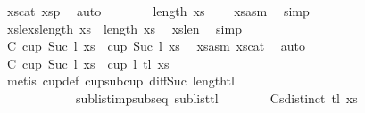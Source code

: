 \begin{isabellebody}
\ xs{\isacharunderscore}{\kern0pt}cat\ xs{}p{}\ \isamarkupfalse%
\ auto\isanewline
\isanewline
\ \ \ \ \ \ \isamarkupfalse%
\ {\isachardoublequoteopen}length\ xs{}\ {\isacharequal}{\kern0pt}\ {}{\isachardoublequoteclose}\ \isamarkupfalse%
\ xs{}asm\ \isamarkupfalse%
\ simp\isanewline
\ \ \ \ \ \ \isamarkupfalse%
\ xs{}lexs{\isacharcolon}{\kern0pt}{\isachardoublequoteopen}length\ xs{}\ {\isacharequal}{\kern0pt}\ length\ xs{\isachardoublequoteclose}\ \isamarkupfalse%
\ xs{\isacharunderscore}{\kern0pt}len\ \isamarkupfalse%
\ simp\isanewline
\ \ \ \ \ \ \isamarkupfalse%
\ C{}{\isacharcolon}{\kern0pt}\ {\isachardoublequoteopen}cup\ {\isacharparenleft}{\kern0pt}Suc\ {\isacharparenleft}{\kern0pt}l{\isacharplus}{\kern0pt}{}{\isacharparenright}{\kern0pt}{\isacharparenright}{\kern0pt}\ xs\ {\isasymLongrightarrow}\ cup\ {\isacharparenleft}{\kern0pt}Suc\ {\isacharparenleft}{\kern0pt}l{\isacharplus}{\kern0pt}{}{\isacharparenright}{\kern0pt}{\isacharparenright}{\kern0pt}\ xs{}{\isachardoublequoteclose}\ \isamarkupfalse%
\ xs{}asm\ xs{\isacharunderscore}{\kern0pt}cat\ \isamarkupfalse%
\ auto\isanewline
\ \ \ \ \ \ \isamarkupfalse%
\ C{}{\isacharcolon}{\kern0pt}\ {\isachardoublequoteopen}cup\ {\isacharparenleft}{\kern0pt}Suc\ {\isacharparenleft}{\kern0pt}l{\isacharplus}{\kern0pt}{}{\isacharparenright}{\kern0pt}{\isacharparenright}{\kern0pt}\ xs{}\ {\isasymLongrightarrow}\ cup\ {\isacharparenleft}{\kern0pt}l{\isacharplus}{\kern0pt}{}{\isacharparenright}{\kern0pt}\ {\isacharparenleft}{\kern0pt}tl\ xs{}{\isacharparenright}{\kern0pt}{\isachardoublequoteclose}\isanewline
\ \ \ \ \ \ \ \ \isamarkupfalse%
\ {\isacharparenleft}{\kern0pt}metis\ cup{\isacharunderscore}{\kern0pt}def\ cup{\isacharunderscore}{\kern0pt}sub{\isacharunderscore}{\kern0pt}cup\ diff{\isacharunderscore}{\kern0pt}Suc{\isacharunderscore}{\kern0pt}{}\ length{\isacharunderscore}{\kern0pt}tl\isanewline
\ \ \ \ \ \ \ \ \ \ \ \ sublist{\isacharunderscore}{\kern0pt}imp{\isacharunderscore}{\kern0pt}subseq\ sublist{\isacharunderscore}{\kern0pt}tl{\isacharparenright}{\kern0pt}\isanewline
\isanewline
\ \ \ \ \ \ \isamarkupfalse%
\ C{}{\isacharcolon}{\kern0pt}{\isachardoublequoteopen}sdistinct\ {\isacharparenleft}{\kern0pt}tl\ xs{}{\isacharparenright}{\kern0pt}{\isachardoublequoteclose}\ \isamarkupfalse%

\end{isabellebody}
